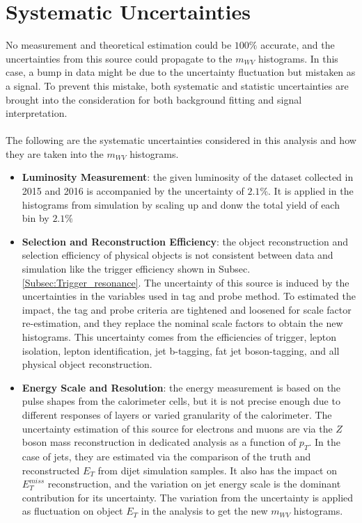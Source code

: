 \section{Systematic Uncertainties}
No measurement and theoretical estimation could be $100\%$ accurate, and the uncertainties from this source could propagate to the $m_{WV}$ histograms. In this case, a bump in data might be due to the uncertainty fluctuation but mistaken as a signal. To prevent this mistake, both systematic and statistic uncertainties are brought into the consideration for both background fitting and signal interpretation.
\\
\\The following are the systematic uncertainties considered in this analysis and how they are taken into the $m_{WV}$ histograms.
\begin{itemize}
	\item{\bf Luminosity Measurement}: the given luminosity of the dataset collected in 2015 and 2016 is accompanied by the uncertainty of $2.1\%$. It is applied in the histograms from simulation by scaling up and donw the total yield of each bin by $2.1\%$

	\item{\bf Selection and Reconstruction Efficiency}: the object reconstruction and selection efficiency of physical objects is not consistent between data and simulation like the trigger efficiency shown in Subsec. \ref{Subsec:Trigger_resonance}. The uncertainty of this source is induced by the uncertainties in the variables used in tag and probe method. To estimated the impact, the tag and probe criteria are tightened and loosened for scale factor re-estimation, and they replace the nominal scale factors to obtain the new histograms. This uncertainty comes from the efficiencies of trigger, lepton isolation, lepton identification, jet b-tagging, fat jet boson-tagging, and all physical object reconstruction. 

	\item{\bf Energy Scale and Resolution}: the energy measurement is based on the pulse shapes from the calorimeter cells, but it is not precise enough due to different responses of layers or varied granularity of the calorimeter. The uncertainty estimation of this source for electrons and muons are via the $Z$ boson mass reconstruction in dedicated analysis as a function of $p_{T}$. In the case of jets, they are estimated via the comparison of the truth and reconstructed $E_{T}$ from dijet simulation samples. It also has the impact on $E^{miss}_{T}$ reconstruction, and the variation on jet energy scale is the dominant contribution for its uncertainty. The variation from the uncertainty is applied as fluctuation on object $E_T$ in the analysis to get the new $m_{WV}$ histograms.


\end{itemize}
